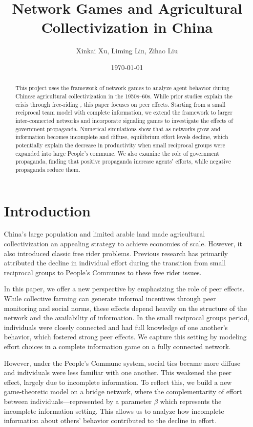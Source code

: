 \documentclass[12pt]{article}
\title{Network Games and Agricultural Collectivization in China}
\author{Xinkai Xu, Liming Lin, Zihao Liu}
\date{\today}
\begin{document}
\maketitle
\onehalfspacing

\begin{abstract}
  This project uses the framework of network games to analyze agent behavior during Chinese agricultural collectivization in the 1950s–60s. While prior studies explain the crisis through free-riding \citep{chinnDiligenceLazinessChinese1980, lin1990collectivization}, this paper focuses on peer effects. Starting from a small reciprocal team model with complete information, we extend the framework to larger inter-connected networks and incorporate signaling games to investigate the effects of government propaganda. Numerical simulations show that as networks grow and information becomes incomplete and diffuse, equilibrium effort levels decline, which potentially explain the decrease in productivity when small reciprocal groups were expanded into large People's commune. We also examine the role of government propaganda, finding that positive propaganda increase agents’ efforts, while negative propaganda reduce them.
\end{abstract}

\section{Introduction}
China's large population and limited arable land made agricultural collectivization an appealing strategy to achieve economies of scale. However, it also introduced classic free rider problems. Previous research has primarily attributed the decline in individual effort during the transition from small reciprocal groups to People's Communes to these free rider issues.\citep{chinnDiligenceLazinessChinese1980,lin1990collectivization}

In this paper, we offer a new perspective by emphasizing the role of peer effects. While collective farming can generate informal incentives through peer monitoring and social norms, these effects depend heavily on the structure of the network and the availability of information. In the small reciprocal groups period, individuals were closely connected and had full knowledge of one another's behavior, which fostered strong peer effects. We capture this setting by modeling effort choices in a complete information game on a fully connected network.

However, under the People's Commune system, social ties became more diffuse and individuals were less familiar with one another. This weakened the peer effect, largely due to incomplete information. To reflect this, we build a new game-theoretic model on a bridge network, where the complementarity of effort between individuals—represented by a parameter $\beta$ which represents the incomplete information setting. This allows us to analyze how incomplete information about others' behavior contributed to the decline in effort.
\end{document}
